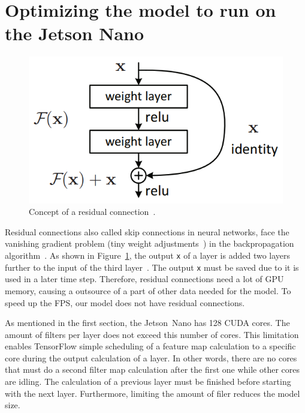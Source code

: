 \documentclass[a4paper,12pt, listof=totoc,toc=sectionentrywithdots]{scrartcl}
\begin{document}
\section{Optimizing the model to run on the Jetson Nano }


\begin{figure}

\centering
        \includegraphics[totalheight=4cm]{Figures/ResidualConnection.png}
    \caption{Concept of a residual connection~\cite{residualConnectionImg}.}
    \label{fig:ResidualConnection}

\end{figure}

Residual connections also called skip connections in neural networks, face the vanishing gradient problem (tiny weight adjustments~\cite{vanishingGradients}) in the backpropagation algorithm~\cite{resnet}.
As shown in Figure~\ref{fig:ResidualConnection}, the output \texttt{x} of a layer is added two layers further to the input of the third layer~\cite{resnet}.
The output \texttt{x} must be saved due to it is used in a later time step.
Therefore, residual connections need a lot of GPU memory, causing a outsource of a part of other data needed for the model.
To speed up the FPS, our model does not have residual connections.

As mentioned in the first section, the Jetson~Nano has 128 CUDA cores.
The amount of filters per layer does not exceed this number of cores.
This limitation enables TensorFlow simple scheduling of a feature map calculation to a specific core during the output calculation of a layer.
In other words, there are no cores that must do a second filter map calculation after the first one while other cores are idling.
The calculation of a previous layer must be finished before starting with the next layer.
Furthermore, limiting the amount of filer reduces the model size.
\end{document}
